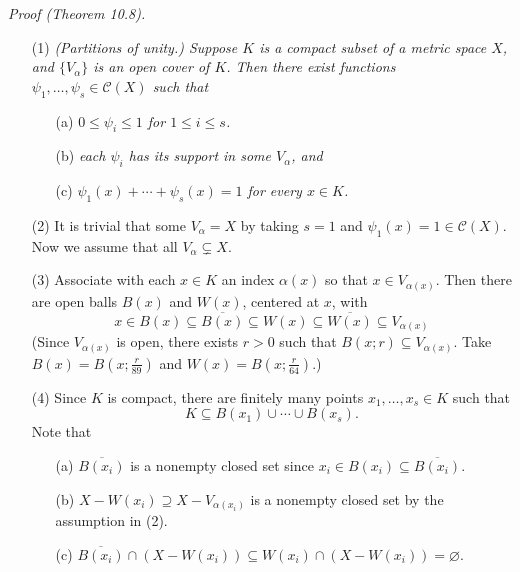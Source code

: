 \documentclass{article}
\begin{document}
\emph{Proof (Theorem 10.8).}
\begin{enumerate}
\item[(1)]
  \emph{(Partitions of unity.)
  Suppose $K$ is a compact subset of a metric space $X$,
  and $\{V_{\alpha}\}$ is an open cover of $K$.
  Then there exist functions $\psi_1, \ldots, \psi_s \in \mathscr{C}(X)$ such that}
  \begin{enumerate}
  \item[(a)]
    \emph{$0 \leq \psi_i \leq 1$ for $1 \leq i \leq s$.}

  \item[(b)]
    \emph{each $\psi_i$ has its support in some $V_{\alpha}$, and}

  \item[(c)]
    \emph{$\psi_1(x) + \cdots + \psi_s(x) = 1$ for every $x \in K$.}
  \end{enumerate}

\item[(2)]
  It is trivial that some $V_{\alpha} = X$
  by taking $s = 1$ and $\psi_1(x) = 1 \in \mathscr{C}(X)$.
  Now we assume that all $V_{\alpha} \subsetneq X$.

\item[(3)]
  Associate with each $x \in K$ an index $\alpha(x)$ so that $x \in V_{\alpha(x)}$.
  Then there are open balls $B(x)$ and $W(x)$, centered at $x$,
  with
  \[
    x
    \in B(x)
    \subseteq \overline{B(x)}
    \subseteq W(x)
    \subseteq \overline{W(x)}
    \subseteq V_{\alpha(x)}
  \]
  (Since $V_{\alpha(x)}$ is open, there exists $r > 0$
  such that $B(x;r) \subseteq V_{\alpha(x)}$.
  Take $B(x) = B\left(x;\frac{r}{89}\right)$
  and $W(x) = B\left(x;\frac{r}{64}\right)$.)

\item[(4)]
  Since $K$ is compact, there are finitely many points
  $x_1, \ldots, x_s \in K$ such that
  \[
    K \subseteq B(x_1) \cup \cdots \cup B(x_s).
  \]
  Note that
  \begin{enumerate}
  \item[(a)]
    $\overline{B(x_i)}$ is a nonempty closed set since $x_i \in B(x_i) \subseteq \overline{B(x_i)}$.

  \item[(b)]
    $X - W(x_i) \supseteq X - V_{\alpha(x_i)}$ is a nonempty closed set by the assumption in (2).

  \item[(c)]
    $\overline{B(x_i)} \cap (X - W(x_i)) \subseteq W(x_i) \cap (X - W(x_i)) = \varnothing$.


\end{enumerate}
\end{enumerate}
\end{document}
